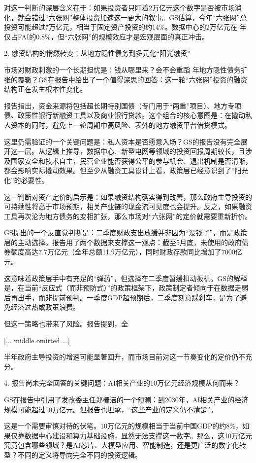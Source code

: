 \documentclass[11pt]{ctexart}
\begin{document}
对这一判断的深层含义在于：如果投资者只盯着2万亿元这个数字是否被市场消化，就会错过“六张网”整体投资加速这一更大的叙事。GS估算，今年“六张网”总投资可能超过7万亿元，相当于固定资产投资的约14\%。数据中心的2万亿元在 年仅占FAI的0.8\%，但“六张网”的规模效应才是宏观层面的真正冲击。

2. 融资结构的悄然转变：从地方隐性债务到多元化“阳光融资”

市场对财政刺激的一个长期担忧是：钱从哪里来？会不会重蹈 年地方隐性债务扩张的覆辙？GS在报告中给出了一个值得深思的回答：这一轮“六张网”投资的融资结构正在发生根本性变化。

报告指出，资金来源将包括超长期特别国债（专门用于“两重”项目）、地方专项债、政策性银行新融资工具以及商业银行贷款。这个组合的核心意图是：在撬动私人资本的同时，避免上一轮周期中高风险、表外的地方融资平台借贷模式。

这里仍需验证的一个关键问题是：私人资本是否愿意入场？GS的报告没有完全展开这一层。从逻辑上推导，数据中心、新型电网等领域的投资回报周期较长，且涉及国家安全和技术自主，民营企业能否获得公平的参与机会、退出机制是否清晰，都会影响实际撬动效果。但至少从融资工具设计上看，政策层已经意识到了“阳光化”的必要性。

这一判断对资产定价的启示是：如果融资结构确实得到改善，那么政府主导投资的可持续性将高于市场预期，相关产业链的现金流可见度也会提升。反之，如果融资工具再次沦为地方债务的变相扩张，那么市场对“六张网”的定价就需要重新折价。

GS提出的一个反直觉判断是：二季度财政支出放缓并非因为“没钱了”，而是政策层的主动选择。报告用了两个数据来支撑这一观点：截至5月底，未使用的政府债券额度高达7.7万亿元（全年总额11.9万亿元），同时财政存款同比增加了7000亿元。

这意味着政策层手中有充足的“弹药”，但选择在二季度暂缓扣动扳机。GS的解释是，在当前“反应式（而非预防式）”的政策框架下，政策制定者倾向于在数据走弱后再出手，而非提前预判。一季度GDP超预期后，二季度刻意踩刹车，是为了避免经济过热或政策浪费。

但这一策略也带来了风险。报告提到，全

[... middle omitted ...]

半年政府主导投资的增速可能显著回升，而市场目前对这一节奏变化的定价仍不充分。

4. 报告尚未完全回答的关键问题：AI相关产业的10万亿元经济规模从何而来？

GS在报告中引用了发改委主任郑栅洁的一个预测：到2030年，AI相关产业的经济规模可能超过10万亿元。但报告也坦承，“这些产业的定义仍不清楚”。

这是一个需要审慎对待的伏笔。10万亿元的规模相当于当前中国GDP的约8\%，如果仅靠数据中心建设和算力基础设施，显然无法支撑这一数字。那么，这10万亿元究竟包含哪些领域？是AI芯片、大模型应用、智能制造，还是更广泛的数字化转型？不同的定义将导向完全不同的投资逻辑。
\end{document}

